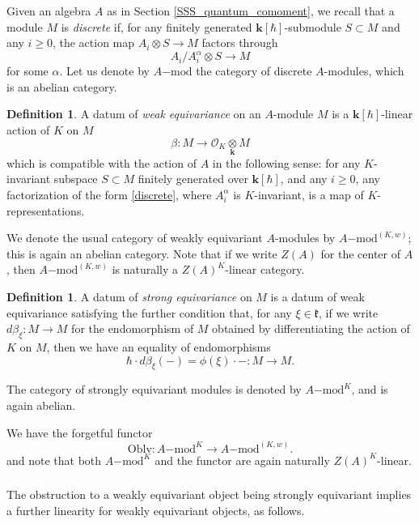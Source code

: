 \documentclass{amsart}
\theoremstyle{definition}
\newtheorem{defi}[Thm]{Definition}
\newcommand{\fk}{\mathfrak{k}}
\newcommand{\lmod}{\on{-mod}}
\newcommand{\sss}{\subsubsection{}}
\newcommand{\OO}{\mathscr{O}}
\newcommand{\on}{\mathrm}
\newcommand{\bk}{\mathbf{k}}
\numberwithin{equation}{section}
\begin{document}
{ \sss Given an algebra $A$ as in Section \ref{SSS_quantum_comoment}, we recall that a module $M$ is {\em discrete} if, for any finitely generated $\bk[\hbar]$-submodule $S \subset M$ and any $i \geqslant 0$, the action map $A_{ i} \otimes S \rightarrow M$ factors through 
\begin{equation} \label{discrete} A_{ i}/A_{ i}^\alpha \otimes S \rightarrow M \end{equation}
for some $\alpha$. Let us denote by $A\lmod$ the category of discrete $A$-modules, which is an abelian category.


\begin{defi} A datum of {\em weak equivariance} on an $A$-module $M$ is a $\bk[\hbar]$-linear action of $K$ on $M$
$$\beta: M \rightarrow \OO_K \underset {\bk} \otimes M$$
which is compatible with the action of $A$ in the following sense: for any $K$-invariant subspace $S \subset M$ finitely generated over $\bk[\hbar]$, and any $i \geqslant 0$, any factorization of the form \eqref{discrete}, where $A^\alpha_{ i}$ is $K$-invariant, is a map of $K$-representations.    
\end{defi}

 We denote the usual category of weakly equivariant $A$-modules by $A\lmod^{(K,w)}$; this is again an abelian category. Note that if we write $Z(A)$ for the center of $A$, then $A\lmod^{(K,w)}$ is naturally a $Z(A)^K$-linear category. 




\begin{defi} A datum of {\em strong equivariance} on $M$ is a datum of weak equivariance satisfying the further condition that, for any $\xi \in \fk$, if we write $d\beta_\xi: M \rightarrow M$ for the endomorphism of $M$ obtained by differentiating the action of $K$ on $M$, then we have an equality of endomorphisms
$$\hbar \cdot d\beta_\xi(-) = \phi(\xi) \cdot -: M \rightarrow M.$$
\end{defi}
The category of strongly equivariant modules is denoted by $A\lmod^K$, and is again abelian. }
We have the forgetful functor $$\on{Oblv}: A\lmod^{K} \rightarrow A\lmod^{(K,w)}.$$
and note that both $A\lmod^K$ and the functor are again naturally $Z(A)^K$-linear. 

\sss The obstruction to a weakly equivariant object being strongly equivariant implies a further linearity for weakly equivariant objects, as follows. 
\end{document}
